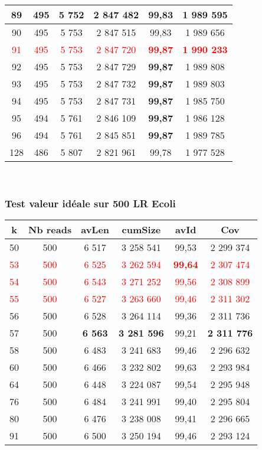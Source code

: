 \documentclass[12pt]{article}
\begin{document}
\begin{tabular}{|c|c|c|c|c|c|}
	\hline
	89 & 495 & 5 752 & 2 847 482 & 99,83 & 1 989 595 \\
	\hline
	90 & 495 & 5 753 & 2 847 515 & 99,83 & 1 989 656 \\
	\hline
	\textcolor{red}{91} & \textcolor{red}{495} & \textcolor{red}{5 753} & \textcolor{red}{2 847 720} & \textcolor{red}{\textbf{99,87}} & \textcolor{red}{\textbf{1 990 233}} \\
	\hline
	92 & 495 & 5 753 & 2 847 729 & \textbf{99,87} & 1 989 808 \\
	\hline
	93 & 495 & 5 753 & 2 847 732 & \textbf{99,87} & 1 989 803 \\
	\hline
	94 & 495 & 5 753 & 2 847 731 & \textbf{99,87} & 1 985 750 \\
	\hline
	95 & 494 & 5 761 & 2 846 109 & \textbf{99,87} & 1 986 128 \\
	\hline
	96 & 494 & 5 761 & 2 845 851 & \textbf{99,87} & 1 989 785 \\
	\hline
	128 & 486 & 5 807 & 2 821 961 & 99,78 & 1 977 528 \\
	\hline
\end{tabular} \\

\subsubsection{Test valeur idéale sur 500 LR Ecoli}

\begin{tabular}{|c|c|c|c|c|c|}
	\hline
	k & Nb reads & avLen & cumSize & avId & Cov \\
	\hline
	50 & 500 & 6 517 & 3 258 541 & 99,53 & 2 299 374 \\
	\hline
	\textcolor{red}{53} & \textcolor{red}{500} & \textcolor{red}{6 525} & \textcolor{red}{3 262 594} & \textcolor{red}{\textbf{99,64}} & \textcolor{red}{2 307 474} \\
	\hline
	\textcolor{red}{54} & \textcolor{red}{500} & \textcolor{red}{6 543} & \textcolor{red}{3 271 252} & \textcolor{red}{99,56} & \textcolor{red}{2 308 899} \\
	\hline
	\textcolor{red}{55} & \textcolor{red}{500} & \textcolor{red}{6 527} & \textcolor{red}{3 263 660} & \textcolor{red}{99,46} & \textcolor{red}{2 311 302} \\
	\hline
	56 & 500 & 6 528 & 3 264 114 & 99,36 & 2 311 736 \\
	\hline
	57 & 500 & \textbf{6 563} & \textbf{3 281 596} & 99,21 & \textbf{2 311 776} \\
	\hline
	58 & 500 & 6 483 & 3 241 683 & 99,46 & 2 296 632 \\
	\hline
	60 & 500 & 6 466 & 3 232 802 & 99,63 & 2 293 984 \\
	\hline
	64 & 500 & 6 448 & 3 224 087 & 99,54 & 2 295 948 \\
	\hline
	76 & 500 & 6 484 & 3 241 991 & 99,40 & 2 295 804 \\
	\hline
	80 & 500 & 6 476 & 3 238 008 & 99,41 & 2 296 665 \\
	\hline
	91 & 500 & 6 500 & 3 250 194 & 99,46 & 2 293 124 \\
	\hline
\end{tabular} \\
\end{document}
